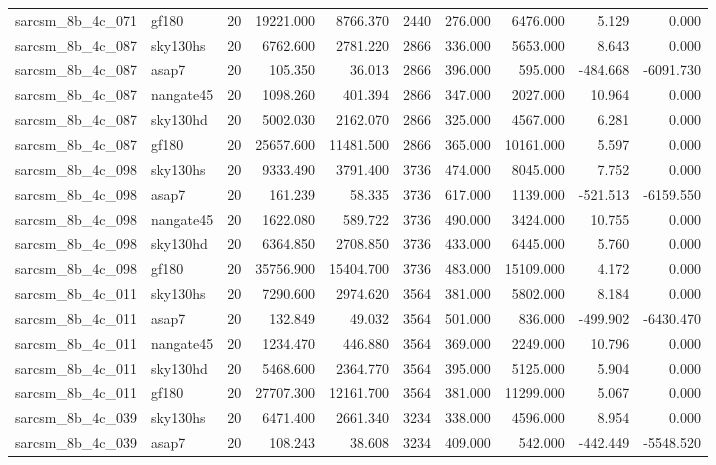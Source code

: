 \begin{tabular}{llrrrrrrrr}
sarcsm\_8b\_4c\_071 & gf180 & 20 & 19221.000 & 8766.370 & 2440 & 276.000 & 6476.000 & 5.129 & 0.000 \\
sarcsm\_8b\_4c\_087 & sky130hs & 20 & 6762.600 & 2781.220 & 2866 & 336.000 & 5653.000 & 8.643 & 0.000 \\
sarcsm\_8b\_4c\_087 & asap7 & 20 & 105.350 & 36.013 & 2866 & 396.000 & 595.000 & -484.668 & -6091.730 \\
sarcsm\_8b\_4c\_087 & nangate45 & 20 & 1098.260 & 401.394 & 2866 & 347.000 & 2027.000 & 10.964 & 0.000 \\
sarcsm\_8b\_4c\_087 & sky130hd & 20 & 5002.030 & 2162.070 & 2866 & 325.000 & 4567.000 & 6.281 & 0.000 \\
sarcsm\_8b\_4c\_087 & gf180 & 20 & 25657.600 & 11481.500 & 2866 & 365.000 & 10161.000 & 5.597 & 0.000 \\
sarcsm\_8b\_4c\_098 & sky130hs & 20 & 9333.490 & 3791.400 & 3736 & 474.000 & 8045.000 & 7.752 & 0.000 \\
sarcsm\_8b\_4c\_098 & asap7 & 20 & 161.239 & 58.335 & 3736 & 617.000 & 1139.000 & -521.513 & -6159.550 \\
sarcsm\_8b\_4c\_098 & nangate45 & 20 & 1622.080 & 589.722 & 3736 & 490.000 & 3424.000 & 10.755 & 0.000 \\
sarcsm\_8b\_4c\_098 & sky130hd & 20 & 6364.850 & 2708.850 & 3736 & 433.000 & 6445.000 & 5.760 & 0.000 \\
sarcsm\_8b\_4c\_098 & gf180 & 20 & 35756.900 & 15404.700 & 3736 & 483.000 & 15109.000 & 4.172 & 0.000 \\
sarcsm\_8b\_4c\_011 & sky130hs & 20 & 7290.600 & 2974.620 & 3564 & 381.000 & 5802.000 & 8.184 & 0.000 \\
sarcsm\_8b\_4c\_011 & asap7 & 20 & 132.849 & 49.032 & 3564 & 501.000 & 836.000 & -499.902 & -6430.470 \\
sarcsm\_8b\_4c\_011 & nangate45 & 20 & 1234.470 & 446.880 & 3564 & 369.000 & 2249.000 & 10.796 & 0.000 \\
sarcsm\_8b\_4c\_011 & sky130hd & 20 & 5468.600 & 2364.770 & 3564 & 395.000 & 5125.000 & 5.904 & 0.000 \\
sarcsm\_8b\_4c\_011 & gf180 & 20 & 27707.300 & 12161.700 & 3564 & 381.000 & 11299.000 & 5.067 & 0.000 \\
sarcsm\_8b\_4c\_039 & sky130hs & 20 & 6471.400 & 2661.340 & 3234 & 338.000 & 4596.000 & 8.954 & 0.000 \\
sarcsm\_8b\_4c\_039 & asap7 & 20 & 108.243 & 38.608 & 3234 & 409.000 & 542.000 & -442.449 & -5548.520 \\

\end{tabular}
